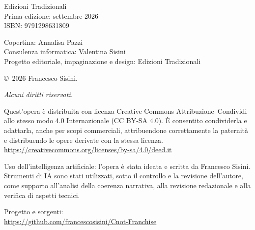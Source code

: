 \clearpage
\thispagestyle{empty}
\vfill
\vspace*{7cm}
\begin{flushleft}
\scriptsize

Edizioni Tradizionali\\
\medskip
\noindent Prima edizione: settembre 2026\\
ISBN: 9791298631809\par

\medskip
\noindent Copertina: Annalisa Pazzi\\
Consulenza informatica: Valentina Sisini\\
Progetto editoriale, impaginazione e design: Edizioni Tradizionali\par

\medskip
\noindent\copyright\ 2026 Francesco Sisini.\par
\textit{Alcuni diritti riservati.}\par

\medskip
\noindent Quest'opera \`e distribuita con licenza
Creative Commons Attribuzione--Condividi allo stesso modo 4.0 Internazionale
(CC BY-SA 4.0). \`E consentito condividerla e adattarla, anche per scopi
commerciali, attribuendone correttamente la paternità e distribuendo le opere
derivate con la stessa licenza.\\
\url{https://creativecommons.org/licenses/by-sa/4.0/deed.it}\par

\medskip
\noindent Uso dell'intelligenza artificiale:
l'opera \`e stata ideata e scritta da Francesco Sisini. Strumenti di IA sono stati
utilizzati, sotto il controllo e la revisione dell'autore, come supporto
all'analisi della coerenza narrativa, alla revisione redazionale e alla verifica
di aspetti tecnici.\par

\medskip
\noindent Progetto e sorgenti:\\
\url{https://github.com/francescosisini/Cnot-Franchise}\par
\end{flushleft}
